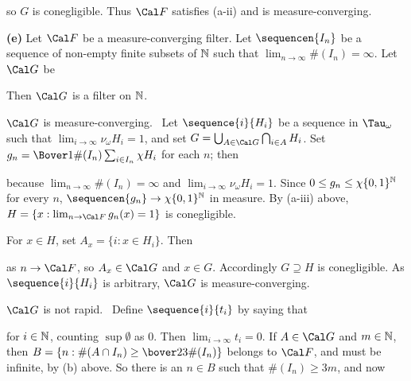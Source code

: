{\noindent so $G$ is conegligible.   Thus $\Cal F$ satisfies (a-ii) and is
measure-converging.

\medskip

{\bf (e)} Let $\Cal F$ be a measure-converging filter.
Let $\sequencen{I_n}$ be a
sequence of non-empty finite subsets of $\Bbb N$ such that
$\lim_{n\to\infty}\#(I_n)=\infty$.   Let $\Cal G$ be


\noindent Then $\Cal G$ is a filter on $\Bbb N$.

\medskip

 $\Cal G$ is measure-converging.  \Prf\ Let
$\sequence{i}{H_i}$ be a sequence in $\Tau_{\omega}$ such that
$\lim_{i\to\infty}\nu_{\omega}H_i=1$, and set
$G=\bigcup_{A\in\Cal G}\bigcap_{i\in A}H_i$.   Set
$g_n=\Bover1{\#(I_n)}\sum_{i\in I_n}\chi H_i$ for each $n$;  then


\noindent because $\lim_{n\to\infty}\#(I_n)=\infty$ and
$\lim_{i\to\infty}\nu_{\omega}H_i=1$.   Since
$0\le g_n\le\chi\{0,1\}^{\Bbb N}$ for every $n$,
$\sequencen{g_n}\to\chi\{0,1\}^{\Bbb N}$ in measure.   By (a-iii) above,
$H=\{x:\lim_{n\to\Cal F}g_n(x)=1\}$ is conegligible.

For $x\in H$, set $A_x=\{i:x\in H_i\}$.   Then


\noindent as $n\to\Cal F$, so $A_x\in\Cal G$ and $x\in G$.   Accordingly
$G\supseteq H$ is conegligible.   As $\sequence{i}{H_i}$ is arbitrary,
$\Cal G$ is measure-converging.\ \Qed

\medskip

 $\Cal G$ is not rapid.   \Prf\
Define $\sequence{i}{t_i}$ by saying that


\noindent for $i\in\Bbb N$, counting $\sup\emptyset$ as $0$.
Then $\lim_{i\to\infty}t_i=0$.   If $A\in\Cal G$ and $m\in\Bbb N$, then
$B=\{n:\#(A\cap I_n)\ge\bover23\#(I_n)\}$
belongs to $\Cal F$, and must be infinite, by (b) above.
So there is an $n\in B$ such that $\#(I_n)\ge 3m$, and now


}
